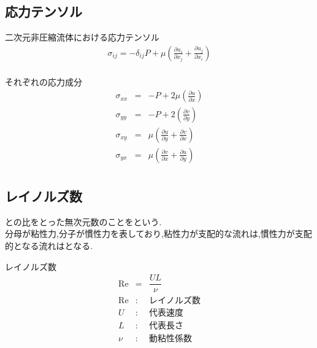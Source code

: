 \documentclass[a4paper]{jsarticle}
\begin{document}
\subsection{応力テンソル}
\begin{itembox}[l]{二次元非圧縮流体における応力テンソル}
    \begin{eqnarray*}
        \sigma_{ij}=-\delta_{ij}P+\mu\left(\frac{\partial u_i}{\partial x_j}+\frac{\partial u_j}{\partial x_i}\right)\\
    \end{eqnarray*}
\end{itembox}
\begin{itembox}[l]{それぞれの応力成分}
    \begin{eqnarray*}
        \sigma_{xx} &=& -P+2\mu\left(\frac{\partial u}{\partial x}\right)\\
        \sigma_{yy} &=& -P+2\left(\frac{\partial v}{\partial y}\right)\\
        \sigma_{xy} &=& \mu\left(\frac{\partial u}{\partial y}+\frac{\partial v}{\partial x}\right)\\
        \sigma_{yx} &=& \mu\left(\frac{\partial v}{\partial x}+\frac{\partial u}{\partial y}\right)\\
    \end{eqnarray*}
\end{itembox}
\subsection{レイノルズ数}
との比をとった無次元数のことをという.\\
分母が粘性力,分子が慣性力を表しており,粘性力が支配的な流れは,慣性力が支配的となる流れはとなる.\\
\begin{itembox}[l]{レイノルズ数}
    \begin{eqnarray*}
        \mathrm{Re}&=&\dfrac{UL}{\nu}\\
        \mathrm{Re} &:& レイノルズ数\\
        U &:& 代表速度\\
        L &:& 代表長さ\\
        \nu &:& 動粘性係数\\
    \end{eqnarray*}
\end{itembox}
\end{document}
